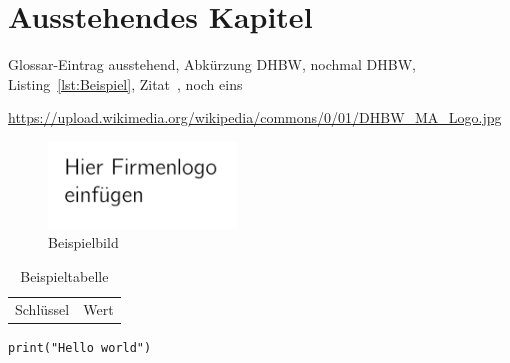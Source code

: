 \section{Ausstehendes Kapitel}

Glossar\hyp{}Eintrag \gls{ausstehend}, Abkürzung \ac{DHBW}, nochmal \ac{DHBW}, Listing~\ref{lst:Beispiel}, Zitat~\cite[vgl.][]{OnlineKey}, noch eins~\cite[S.~1]{BookKey}

\begin{sloppypar}
\url{https://upload.wikimedia.org/wikipedia/commons/0/01/DHBW_MA_Logo.jpg}
\end{sloppypar}


\begin{figure}
    \caption{Beispielbild}
    \includegraphics[width=5cm]{img/logo.png}
\end{figure}

\begin{table}
    \caption{Beispieltabelle}
    \begin{tabular}{ll}
        Schlüssel&Wert
    \end{tabular}
\end{table}

\begin{lstfloat}
\begin{lstlisting}
print("Hello world")
\end{lstlisting}
\end{lstfloat}
